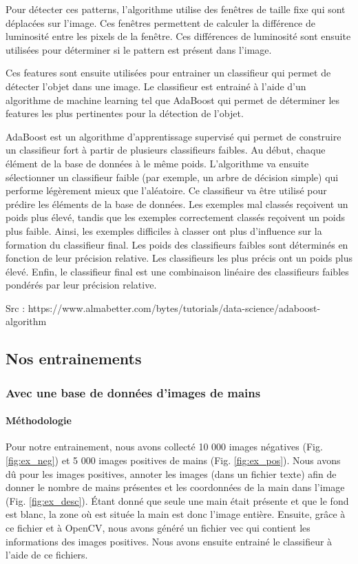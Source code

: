 \documentclass[11pt]{article}
\begin{document}
\bigbreak

Pour détecter ces patterns, l'algorithme utilise des fenêtres de taille fixe qui sont déplacées sur l'image. Ces fenêtres permettent de calculer la différence de luminosité entre les pixels de la fenêtre. Ces différences de luminosité sont ensuite utilisées pour déterminer si le pattern est présent dans l'image. 

\bigbreak

Ces features sont ensuite utilisées pour entrainer un classifieur qui permet de détecter l'objet dans une image. Le classifieur est entrainé à l'aide d'un algorithme de machine learning tel que AdaBoost qui permet de déterminer les features les plus pertinentes pour la détection de l'objet. \bigbreak

AdaBoost est un algorithme d'apprentissage supervisé qui permet de construire un classifieur fort à partir de plusieurs classifieurs faibles.
Au début, chaque élément de la base de données à le même poids. L'algorithme va ensuite sélectionner un classifieur faible (par exemple, un arbre de décision simple) qui performe légèrement mieux que l'aléatoire. Ce classifieur va être utilisé pour prédire les éléments de la base de données. Les exemples mal classés reçoivent un poids plus élevé, tandis que les exemples correctement classés reçoivent un poids plus faible. Ainsi, les exemples difficiles à classer ont plus d'influence sur la formation du classifieur final. Les poids des classifieurs faibles sont déterminés en fonction de leur précision relative. Les classifieurs les plus précis ont un poids plus élevé. Enfin, le classifieur final est une combinaison linéaire des classifieurs faibles pondérés par leur précision relative. \bigbreak


{\LARGE Src : https://www.almabetter.com/bytes/tutorials/data-science/adaboost-algorithm}

\subsection{Nos entrainements}
\subsubsection{Avec une base de données d'images de mains}
\paragraph{Méthodologie}
Pour notre entrainement, nous avons collecté 10 000 images négatives (Fig. \ref{fig:ex_neg}) et 5 000 images positives de mains (Fig. \ref{fig:ex_pos}). Nous avons dû pour les images positives, annoter les images (dans un fichier texte) afin de donner le nombre de mains présentes et les coordonnées de la main dans l'image (Fig. \ref{fig:ex_desc}). \'Etant donné que seule une main était présente et que le fond est blanc, la zone où est située la main est donc l'image entière. Ensuite, grâce à ce fichier et à OpenCV, nous avons généré un fichier vec qui contient les informations des images positives. Nous avons ensuite entrainé le classifieur à l'aide de ce fichiers.
\bigbreak
\end{document}
